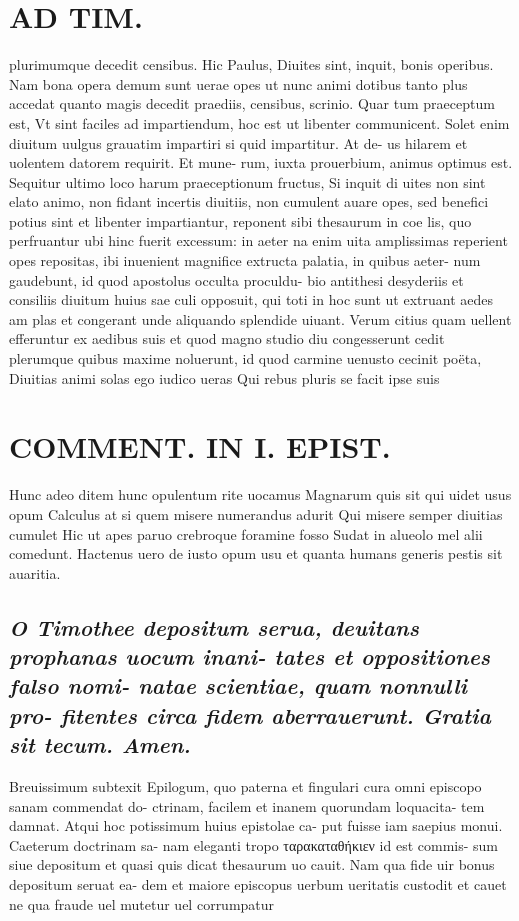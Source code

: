\documentclass{article}
\begin{document}
\begin{pages}
\section*{AD TIM. }
\marginpar{[ p.173 ]}\pstart plurimumque decedit censibus. Hic Paulus, Diuites sint, inquit, bonis operibus. Nam bona opera demum sunt uerae opes ut nunc animi dotibus tanto plus accedat quanto magis decedit praediis, censibus, scrinio. Quar tum praeceptum est, Vt sint faciles ad impartiendum, hoc est ut libenter communicent. Solet enim diuitum uulgus grauatim impartiri si quid impartitur. At de- us hilarem et uolentem datorem requirit. Et mune- rum, iuxta prouerbium, animus optimus est. Sequitur ultimo loco harum praeceptionum fructus, Si inquit di uites non sint elato animo, non fidant incertis diuitiis, non cumulent auare opes, sed benefici potius sint et libenter impartiantur, reponent sibi thesaurum in coe lis, quo perfruantur ubi hinc fuerit excessum: in aeter na enim uita amplissimas reperient opes repositas, ibi inuenient magnifice extructa palatia, in quibus aeter- num gaudebunt, id quod apostolus occulta proculdu- bio antithesi desyderiis et consiliis diuitum huius sae culi opposuit, qui toti in hoc sunt ut extruant aedes am plas et congerant unde aliquando splendide uiuant. Verum citius quam uellent efferuntur ex aedibus suis et quod magno studio diu congesserunt cedit plerumque  quibus maxime noluerunt, id quod carmine uenusto cecinit poëta,  \pend\pstart Diuitias animi solas ego iudico ueras Qui rebus pluris se facit ipse suis  \pend
\section*{COMMENT. IN I. EPIST. }\pstart Hunc adeo ditem hunc opulentum rite uocamus Magnarum quis sit qui uidet usus opum Calculus at si quem misere numerandus adurit Qui misere semper diuitias cumulet Hic ut apes paruo crebroque foramine fosso Sudat in alueolo mel alii comedunt.  \pend\pstart Hactenus uero de iusto opum usu et quanta humans generis pestis sit auaritia.  \pend
{}
{}
\subsection*{\textit{O Timothee depositum serua, deuitans prophanas uocum inani- tates et oppositiones falso nomi- natae scientiae, quam nonnulli pro- fitentes circa fidem aberrauerunt. Gratia sit tecum. Amen. }}\pstart Breuissimum subtexit Epilogum, quo paterna et fingulari cura omni episcopo sanam commendat do- ctrinam, facilem et inanem quorundam loquacita- tem damnat. Atqui hoc potissimum huius epistolae ca- put fuisse iam saepius monui. Caeterum doctrinam sa- nam eleganti tropo ταρακαταθήκιεν id est commis- sum siue depositum et quasi quis dicat thesaurum uo cauit. Nam qua fide uir bonus depositum seruat ea- dem et maiore episcopus uerbum ueritatis custodit et cauet ne qua fraude uel mutetur uel corrumpatur  \pend

\end{pages}
\end{document}
